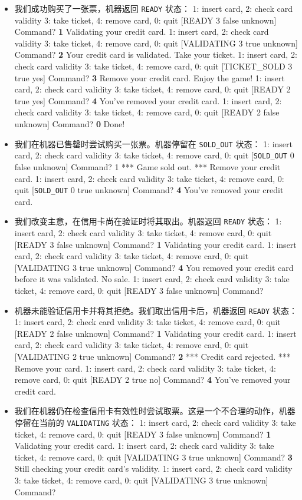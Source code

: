 \begin{itemize}
\item 我们成功购买了一张票，机器返回 \texttt{READY} 状态： 1: insert card, 2: check card validity 3: take ticket, 4: remove card, 0: quit [READY 3 false unknown] Command? \textbf{1} Validating your credit card. 1: insert card, 2: check card validity 3: take ticket, 4: remove card, 0: quit [VALIDATING 3 true unknown] Command? \textbf{2} Your credit card is validated. Take your ticket. 1: insert card, 2: check card validity 3: take ticket, 4: remove card, 0: quit [TICKET\_SOLD 3 true yes] Command? \textbf{3} Remove your credit card. Enjoy the game! 1: insert card, 2: check card validity 3: take ticket, 4: remove card, 0: quit [READY 2 true yes] Command? \textbf{4} You’ve removed your credit card. 1: insert card, 2: check card validity 3: take ticket, 4: remove card, 0: quit [READY 2 false unknown] Command? \textbf{0} Done!
\item 我们在机器已售罄时尝试购买一张票。机器停留在 \texttt{SOLD\_OUT} 状态： 1: insert card, 2: check card validity 3: take ticket, 4: remove card, 0: quit [\texttt{SOLD\_OUT} 0 false unknown] Command? 1 *** Game sold out. *** Remove your credit card. 1: insert card, 2: check card validity 3: take ticket, 4: remove card, 0: quit [\texttt{SOLD\_OUT} 0 true unknown] Command? \textbf{4} You’ve removed your credit card.
\item 我们改变主意，在信用卡尚在验证时将其取出。机器返回 \texttt{READY} 状态： 1: insert card, 2: check card validity 3: take ticket, 4: remove card, 0: quit [READY 3 false unknown] Command? \textbf{1} Validating your credit card. 1: insert card, 2: check card validity 3: take ticket, 4: remove card, 0: quit [VALIDATING 3 true unknown] Command? \textbf{4} You removed your credit card before it was validated. No sale. 1: insert card, 2: check card validity 3: take ticket, 4: remove card, 0: quit [READY 3 false unknown] Command?
\item 机器未能验证信用卡并将其拒绝。我们取出信用卡后，机器返回 \texttt{READY} 状态： 1: insert card, 2: check card validity 3: take ticket, 4: remove card, 0: quit [READY 2 false unknown] Command? \textbf{1} Validating your credit card. 1: insert card, 2: check card validity 3: take ticket, 4: remove card, 0: quit [VALIDATING 2 true unknown] Command? \textbf{2} *** Credit card rejected. *** Remove your card. 1: insert card, 2: check card validity 3: take ticket, 4: remove card, 0: quit [READY 2 true no] Command? \textbf{4} You’ve removed your credit card.
\item 我们在机器仍在检查信用卡有效性时尝试取票。这是一个不合理的动作，机器停留在当前的 \texttt{VALIDATING} 状态： 1: insert card, 2: check card validity 3: take ticket, 4: remove card, 0: quit [READY 3 false unknown] Command? \textbf{1} Validating your credit card. 1: insert card, 2: check card validity 3: take ticket, 4: remove card, 0: quit [VALIDATING 3 true unknown] Command? \textbf{3} Still checking your credit card’s validity. 1: insert card, 2: check card validity 3: take ticket, 4: remove card, 0: quit [VALIDATING 3 true unknown] Command?
\end{itemize}

